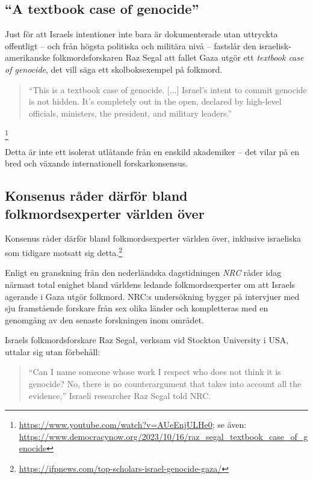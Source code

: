 \subsection{“A textbook case of genocide”}

Just för att Israels intentioner inte bara är dokumenterade utan uttryckta offentligt – och från högsta politiska och militära nivå – fastslår den israelisk-amerikanske folkmordsforskaren Raz Segal att fallet Gaza utgör ett \textit{textbook case of genocide}, det vill säga ett skolboksexempel på folkmord.

\begin{quote}
“This is a textbook case of genocide. [...] Israel’s intent to commit genocide is not hidden. It’s completely out in the open, declared by high-level officials, ministers, the president, and military leaders.”
\end{quote}

\footnote{\url{https://www.youtube.com/watch?v=AUeEnjULHe0}; se även: \url{https://www.democracynow.org/2023/10/16/raz_segal_textbook_case_of_genocide}}

Detta är inte ett isolerat utlåtande från en enskild akademiker – det vilar på en bred och växande internationell forskarkonsensus.


\subsection{Konsenus råder därför bland folkmordsexperter världen över}


Konsenus råder därför bland folkmordsexperter världen över, inklusive israeliska som tidigare motsatt sig detta.\footnote{\url{https://ifpnews.com/top-scholars-israel-genocide-gaza/}}

Enligt en granskning från den nederländska dagstidningen \textit{NRC} råder idag närmast total enighet bland världens ledande folkmordsexperter om att Israels agerande i Gaza utgör folkmord. NRC:s undersökning bygger på intervjuer med sju framstående forskare från sex olika länder och kompletteras med en genomgång av den senaste forskningen inom området. 

Israels folkmordsforskare Raz Segal, verksam vid Stockton University i USA, uttalar sig utan förbehåll:

\begin{quote}
“Can I name someone whose work I respect who does not think it is genocide? No, there is no counterargument that takes into account all the evidence,” Israeli researcher Raz Segal told NRC.
\end{quote}

